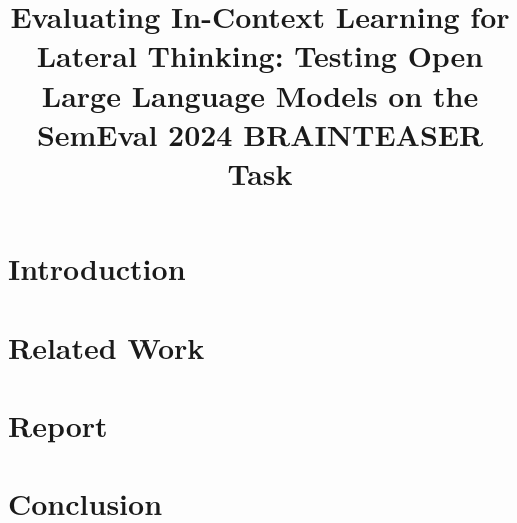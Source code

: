 \documentclass{scrartcl}
\title{Evaluating In-Context Learning for Lateral Thinking: Testing Open Large Language Models on the SemEval 2024 BRAINTEASER Task}
\begin{document}



\begin{abstract}
  
\end{abstract}


\section{Introduction}


\section{Related Work}


\section{Report}


\section{Conclusion}


\clearpage
\printbibliography
\end{document}
